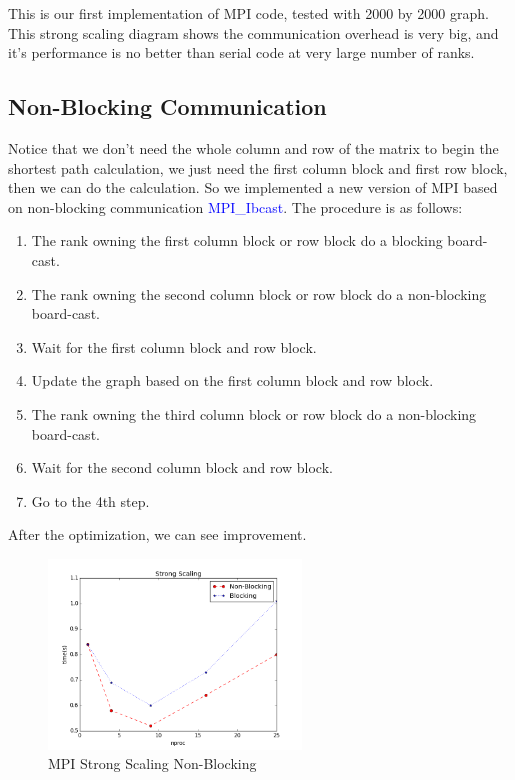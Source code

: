 This is our first implementation of MPI code, tested with 2000 by 2000 graph. This strong scaling diagram shows the communication
overhead is very big, and it's performance is no better than serial code at very large number of ranks. 

\subsection{Non-Blocking Communication}

Notice that we don't need the whole column and row of the matrix to begin the shortest path calculation, we just need the first
column block and first row block, then we can do the calculation. So we implemented a new version of MPI based on non-blocking
communication \textcolor{blue}{MPI\_Ibcast}. The procedure is as follows:
\begin{enumerate}
\item The rank owning the first column block or row block do a blocking board-cast.
\item The rank owning the second column block or row block do a non-blocking board-cast.
\item Wait for the first column block and row block.
\item Update the graph based on the first column block and row block.
\item The rank owning the third column block or row block do a non-blocking board-cast.
\item Wait for the second column block and row block.
\item Go to the 4th step.
\end{enumerate}

After the optimization, we can see improvement.
\begin{figure}[H]
    \centering
    \includegraphics[width=0.6\textwidth]{figs/strong_scaling.png}
    \caption{MPI Strong Scaling Non-Blocking}
\end{figure}

